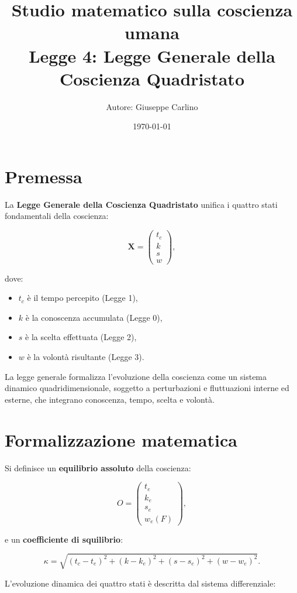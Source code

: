 \documentclass[12pt,a4paper]{article}
\title{\centering Studio matematico sulla coscienza umana \\ Legge 4: Legge Generale della Coscienza Quadristato}
\author{Autore: Giuseppe Carlino}
\date{\today}
\begin{document}
\maketitle

\section{Premessa}

La \textbf{Legge Generale della Coscienza Quadristato} unifica i quattro stati fondamentali della coscienza:

\[
\mathbf{X} = 
\begin{pmatrix}
t_c \\ k \\ s \\ w
\end{pmatrix},
\]

dove:

\begin{itemize}
    \item $t_c$ è il tempo percepito (Legge 1),
    \item $k$ è la conoscenza accumulata (Legge 0),
    \item $s$ è la scelta effettuata (Legge 2),
    \item $w$ è la volontà risultante (Legge 3).
\end{itemize}

La legge generale formalizza l’evoluzione della coscienza come un sistema dinamico quadridimensionale, soggetto a perturbazioni e fluttuazioni interne ed esterne, che integrano conoscenza, tempo, scelta e volontà.

\section{Formalizzazione matematica}

Si definisce un \textbf{equilibrio assoluto} della coscienza:

\[
O = 
\begin{pmatrix}
t_e \\ k_e \\ s_e \\ w_e(F)
\end{pmatrix},
\]

e un \textbf{coefficiente di squilibrio}:

\[
\kappa = \sqrt{(t_c - t_e)^2 + (k - k_e)^2 + (s - s_e)^2 + (w - w_e)^2}.
\]

L’evoluzione dinamica dei quattro stati è descritta dal sistema differenziale:
\end{document}
